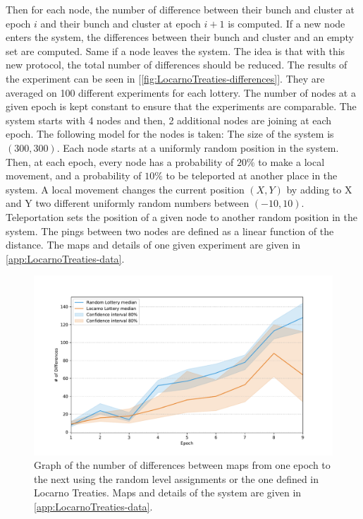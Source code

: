 \documentclass[a4paper,11pt,twoside=semi,openright]{report}
\begin{document}
Then for each node, the number of difference between their bunch and cluster at
epoch $i$ and their bunch and cluster at epoch $i+1$ is computed. If a new node
enters the system, the differences between their bunch and cluster and an empty
set are computed. Same if a node leaves the system. The idea is that with this
new protocol, the total number of differences should be reduced.  The results
of the experiment can be seen in [\autoref{fig:LocarnoTreaties-differences}].
They are averaged on 100 different experiments for each lottery. The number of
nodes at a given epoch is kept constant to ensure that the experiments are
comparable. The system starts with 4 nodes and then, 2 additional nodes are
joining at each epoch. The following model for the nodes is taken: The size of
the system is $(300, 300)$. Each node starts at a uniformly random position in
the system. Then, at each epoch, every node has a probability of $20\%$ to make
a local movement, and a probability of $10\%$ to be teleported at another place
in the system. A local movement changes the current position $(X ,Y)$ by adding
to X and Y two different uniformly random numbers between $(-10, 10)$.
Teleportation sets the position of a given node to another random position in
the system. The pings between two nodes are defined as a linear function of the
distance. The maps and details of one given experiment are given in
\autoref{app:LocarnoTreaties-data}.

\begin{figure}[!h] \centering
  \includegraphics[width=400pt]{figures/LocarnoTreaties-differences}
  \caption{Graph of the number of differences between maps from one epoch to
  the next using the random level assignments or the one defined in Locarno
  Treaties. Maps and details of the system are given in
\autoref{app:LocarnoTreaties-data}. } \label{fig:LocarnoTreaties-differences}
\end{figure}
\end{document}
